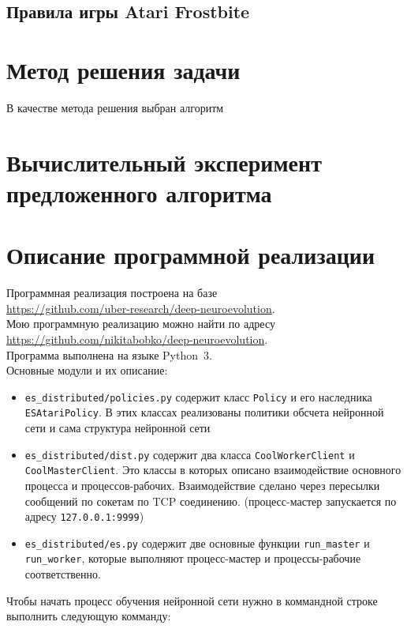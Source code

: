 \documentclass[12pt]{article}
\begin{document}
    \subsection{Правила игры Atari Frostbite}

\section{Метод решения задачи}
    В качестве метода решения выбран алгоритм 

\section{Вычислительный эксперимент предложенного алгоритма}

\section{Описание программной реализации}
    Программная реализация построена на базе \\
    \url{https://github.com/uber-research/deep-neuroevolution}. \\
    Мою программную реализацию можно найти по адресу \\
    \url{https://github.com/nikitabobko/deep-neuroevolution}. \\
    Программа выполнена на языке Python~3.\\

    Основные модули и их описание:
    \begin{itemize}
        \item \verb!es_distributed/policies.py! содержит класс \verb!Policy! и его наследника \verb!ESAtariPolicy!. В этих классах реализованы политики обсчета нейронной сети и сама структура нейронной сети
        \item \verb!es_distributed/dist.py! содержит два класса \verb!CoolWorkerClient! и \verb!CoolMasterClient!. Это классы в которых описано взаимодействие основного процесса и процессов-рабочих. Взаимодействие сделано через пересылки сообщений по сокетам по TCP соединению. (процесс-мастер запускается по адресу \verb!127.0.0.1:9999!)
        \item \verb!es_distributed/es.py! содержит две основные функции \verb!run_master! и \verb!run_worker!, которые выполняют процесс-мастер и процессы-рабочие соответственно.
    \end{itemize}

    Чтобы начать процесс обучения нейронной сети нужно в коммандной строке выполнить следующую комманду: \\
\end{document}
